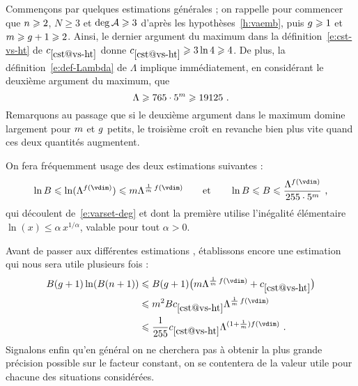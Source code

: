 Commençons par quelques estimations générales ; on rappelle pour commencer que
\( n \geqslant 2 \), \( N \ge 3 \) et \( \deg \mathcal A \geqslant 3 \) d'après les
hypothèses~\ref{h:vaemb}, puis \( g \geqslant 1 \) et \( m \geqslant g + 1
  \geqslant 2 \). Ainsi, le dernier argument du maximum dans la
définition~\eqref{e:cst-vs-ht} de \( \cst{vs-ht} \) donne
\( \cst{vs-ht} \ge 3 \ln 4 \ge 4 \).
De plus, la définition~\eqref{e:def-Lambda} de \( \Lambda \) implique
immédiatement, en considérant le deuxième argument du maximum, que
\begin{equation}
  \Lambda \geqslant 765 \cdot 5^m \geqslant 19125
  \text{ .}
\end{equation}
Remarquons au passage que si le deuxième argument dans le maximum domine
largement pour \( m \) et \( g \) petits, le troisième croît en
revanche bien plus vite quand ces deux quantités augmentent.

On fera fréquemment usage des deux estimations suivantes :
\begin{equation}
  \ln B
  \le
  \ln(\Lambda^{f(\vdim)})
  \le
  \puiss \Lambda^{\frac1\puiss\,f(\vdim)}
  \qquad\text{et}\qquad
  \ln B
  \le
  B
  \le
  \frac{ \Lambda^{f(\vdim)} }{ 255 \cdot 5^\puiss }
  \pmm,
\end{equation}
qui découlent de~\eqref{e:varset-deg} et dont la première utilise l'inégalité
élémentaire \( \ln(x) \le \alpha \, x^{1/\alpha} \), valable pour tout
\( \alpha > 0 \).

Avant de passer aux différentes estimations , établissons encore
une estimation qui nous sera utile plusieurs fois :
\begin{align}
  B (\genre + 1) \ln (B (\dimp+1))
  & \le
  B (\genre + 1) \bigl(
    \puiss \Lambda^{\frac1\puiss\,f(\vdim)}
    + \cst{vs-ht}
  \bigr)
  \\ & \le
  \puiss^2 B \cst{vs-ht} \Lambda^{\frac1\puiss\,f(\vdim)}
  \\ & \le \label{e:adhoc-gen}
  \frac1{255} \cst{vs-ht} \Lambda^{(1 + \frac1\puiss) f(\vdim)}
  \pmm.
\end{align}
Signalons enfin qu'en général on ne cherchera pas à obtenir la plus grande
précision possible sur le facteur constant, on se contentera de la valeur
utile pour chacune des situations considérées.

\medskip

